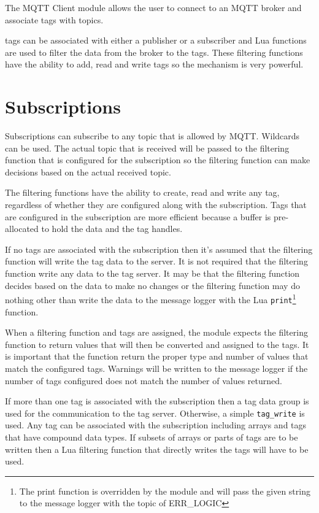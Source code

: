 The MQTT Client module allows the user to connect to an MQTT broker and
associate tags with topics.

\opendax tags can be associated with either a publisher or a subscriber and Lua
functions are used to filter the data from the broker to the \opendax tags. 
These filtering functions have the ability to add, read and write tags so the
mechanism is very powerful.

\section{Subscriptions}

Subscriptions can subscribe to any topic that is allowed by MQTT.  Wildcards can
be used.  The actual topic that is received will be passed to the filtering
function that is configured for the subscription so the filtering function can
make decisions based on the actual received topic.

The filtering functions have the ability to create, read and write any tag,
regardless of whether they are configured along with the subscription.  Tags
that are configured in the subscription are more efficient because a buffer is
pre-allocated to hold the data and the tag handles.

If no tags are associated with the subscription then it's assumed that the
filtering function will write the tag data to the server.  It is not required
that the filtering function write any data to the tag server.  It may be that
the filtering function decides based on the data to make no changes or the
filtering function may do nothing other than write the data to the message
logger with the Lua \texttt{print}\footnote{The print function is overridden by
	the module and will pass the given string to the message logger with the topic
	of ERR\_LOGIC} function.

When a filtering function and tags are assigned, the module expects the
filtering function to return values that will then be converted and assigned to
the tags.  It is important that the function return the proper type and number
of values that match the configured tags.  Warnings will be written to the
message logger if the number of tags configured does not match the number of
values returned.

If more than one tag is associated with the subscription then a tag data group
is used for the communication to the tag server.  Otherwise, a simple
\texttt{tag\_write} is used.  Any tag can be associated with the subscription
including arrays and tags that have compound data types.  If subsets of arrays
or parts of tags are to be written then a Lua filtering function that directly
writes the tags will have to be used.

